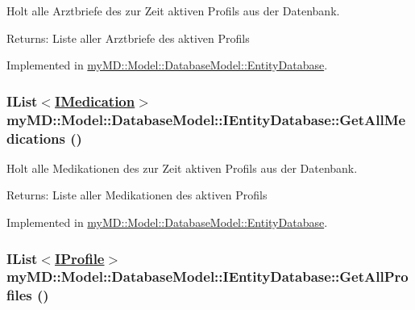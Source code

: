 Holt alle Arztbriefe des zur Zeit aktiven Profils aus der Datenbank. 

\begin{Desc}
\item[Returns:]Liste aller Arztbriefe des aktiven Profils\end{Desc}


Implemented in \hyperlink{classmy_m_d_1_1_model_1_1_database_model_1_1_entity_database_d824e78a8274c2fc04719a66a7030fd7}{my\-MD::Model::Database\-Model::Entity\-Database}.\hypertarget{interfacemy_m_d_1_1_model_1_1_database_model_1_1_i_entity_database_ecff6715a9c8e9604242cc7a688c9939}{
\subsubsection[GetAllMedications]{\setlength{\rightskip}{0pt plus 5cm}IList$<$\hyperlink{interfacemy_m_d_1_1_model_interface_1_1_data_model_interface_1_1_i_medication}{IMedication}$>$ my\-MD::Model::Database\-Model::IEntity\-Database::Get\-All\-Medications ()}}
\label{d3/da9/interfacemy_m_d_1_1_model_1_1_database_model_1_1_i_entity_database_ecff6715a9c8e9604242cc7a688c9939}


Holt alle Medikationen des zur Zeit aktiven Profils aus der Datenbank. 

\begin{Desc}
\item[Returns:]Liste aller Medikationen des aktiven Profils\end{Desc}


Implemented in \hyperlink{classmy_m_d_1_1_model_1_1_database_model_1_1_entity_database_ecff6715a9c8e9604242cc7a688c9939}{my\-MD::Model::Database\-Model::Entity\-Database}.\hypertarget{interfacemy_m_d_1_1_model_1_1_database_model_1_1_i_entity_database_cdd42df8b8413bdd0cd36422d4e3f33c}{
\subsubsection[GetAllProfiles]{\setlength{\rightskip}{0pt plus 5cm}IList$<$\hyperlink{interfacemy_m_d_1_1_model_interface_1_1_data_model_interface_1_1_i_profile}{IProfile}$>$ my\-MD::Model::Database\-Model::IEntity\-Database::Get\-All\-Profiles ()}}
\label{d3/da9/interfacemy_m_d_1_1_model_1_1_database_model_1_1_i_entity_database_cdd42df8b8413bdd0cd36422d4e3f33c}


